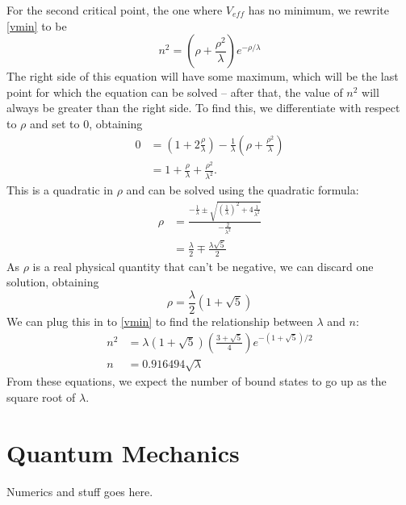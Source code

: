 \documentclass[12pt,twoside]{reedthesis}
\begin{document}
For the second critical point, the one where $V_{eff}$ has no minimum, we rewrite \eqref{vmin} to be
\begin{equation}
n^2 = \left( \rho + \frac{\rho^2}{\lambda} \right) e^{-\rho/\lambda}
\end{equation}
The right side of this equation will have some maximum, which will be the last point for which the equation can be solved -- after that, the value of $n^2$ will always be greater than the right side. To find this, we differentiate with respect to $\rho$ and set to 0, obtaining
\begin{align}
0 &= (1+2 \frac{\rho}{\lambda}) - \frac{1}{\lambda}(\rho + \frac{\rho^2}{\lambda}) \\
&= 1 + \frac{\rho}{\lambda} + \frac{\rho^2}{\lambda^2}\mbox{.}
\end{align}
This is a quadratic in $\rho$ and can be solved using the quadratic formula:
\begin{align}
\rho &= \frac{-\frac{1}{\lambda} \pm \sqrt{\left(\frac{1}{\lambda}\right)^2+4\frac{1}{\lambda^2}}}{-\frac{2}{\lambda^2}} \\
&= \frac{\lambda}{2} \mp \frac{\lambda \sqrt{5}}{2}
\end{align}
As $\rho$ is a real physical quantity that can't be negative, we can discard one solution, obtaining
\begin{equation}
\rho = \frac{\lambda}{2}(1+\sqrt{5})
\end{equation}
We can plug this in to \eqref{vmin} to find the relationship between $\lambda$ and $n$:
\begin{align}
n^2 &= \lambda(1+\sqrt{5})\left(\frac{3+\sqrt{5}}{4}\right)e^{-(1+\sqrt{5})/2} \\
n &= 0.916494 \sqrt{\lambda}
\end{align}
From these equations, we expect the number of bound states to go up as the square root of $\lambda$.
\section{Quantum Mechanics}
Numerics and stuff goes here.

\end{document}
